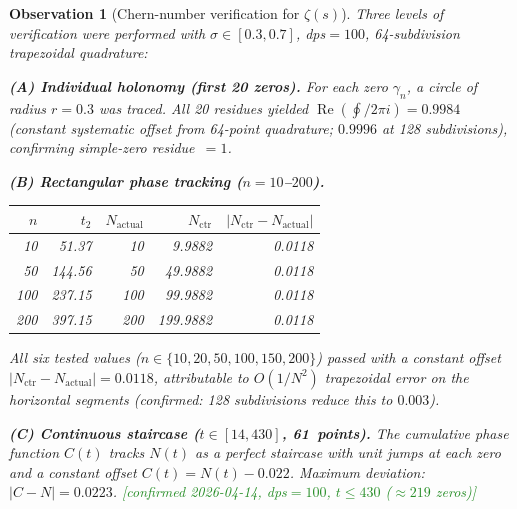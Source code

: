 \documentclass[11pt, a4paper]{article}
\theoremstyle{definition}
\theoremstyle{plain}
\newtheorem{observation}[theorem]{Observation}
\begin{document}
\begin{observation}[Chern-number verification for $\zeta(s)$]
\label{obs:chern_zeta}
Three levels of verification were performed with $\sigma \in [0.3, 0.7]$,
dps${}=100$, 64-subdivision trapezoidal quadrature:

\smallskip\noindent
\textbf{(A) Individual holonomy (first 20 zeros).}
For each zero $\gamma_n$, a circle of radius $r = 0.3$ was traced.
All 20 residues yielded $\operatorname{Re}(\oint/2\pi i) = 0.9984$
(constant systematic offset from 64-point quadrature; $0.9996$ at 128
subdivisions), confirming simple-zero residue~$= 1$.

\smallskip\noindent
\textbf{(B) Rectangular phase tracking ($n = 10$--$200$).}
\begin{center}
\small
\begin{tabular}{@{} r r r r r @{}}
\toprule
$n$ & $t_2$ & $N_{\mathrm{actual}}$ & $N_{\mathrm{ctr}}$ & $|N_{\mathrm{ctr}} - N_{\mathrm{actual}}|$ \\
\midrule
  10 &  51.37 &  10 &   9.9882 & 0.0118 \\
  50 & 144.56 &  50 &  49.9882 & 0.0118 \\
 100 & 237.15 & 100 &  99.9882 & 0.0118 \\
 200 & 397.15 & 200 & 199.9882 & 0.0118 \\
\bottomrule
\end{tabular}
\end{center}
\noindent
All six tested values ($n \in \{10, 20, 50, 100, 150, 200\}$) passed
with a constant offset $|N_{\mathrm{ctr}} - N_{\mathrm{actual}}| = 0.0118$,
attributable to $O(1/N^2)$ trapezoidal error on the horizontal segments
(confirmed: 128 subdivisions reduce this to $0.003$).

\smallskip\noindent
\textbf{(C) Continuous staircase ($t \in [14, 430]$, 61~points).}
The cumulative phase function $C(t)$ tracks
$N(t)$ as a perfect staircase with unit jumps at each zero and a
constant offset $C(t) = N(t) - 0.022$.
Maximum deviation: $|C - N| = 0.0223$.
\textcolor{ForestGreen}{[confirmed 2026-04-14, dps${}=100$, $t \le 430$ ($\approx 219$ zeros)]}
\end{observation}
\end{document}
